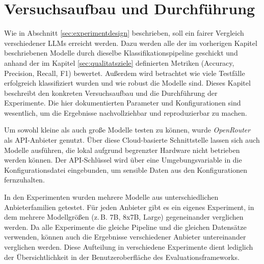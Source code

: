 \chapter{Versuchsaufbau und Durchführung}\label{ch:versuchsaufbau-und-durchfuhrung}

Wie in Abschnitt \ref{sec:experimentdesign} beschrieben, soll ein fairer Vergleich verschiedener \acp{LLM} erreicht werden. Dazu werden alle der im vorherigen Kapitel beschriebenen Modelle durch dieselbe Klassifikationspipeline geschickt und anhand der im Kapitel \ref{sec:qualitatsziele} definierten Metriken (Accuracy, Precision, Recall, F1) bewertet. Außerdem wird betrachtet wie viele Testfälle erfolgreich klassifiziert wurden und wie robust die Modelle sind. Dieses Kapitel beschreibt den konkreten Versuchsaufbau und die Durchführung der Experimente. Die hier dokumentierten Parameter und Konfigurationen sind wesentlich, um die Ergebnisse nachvollziehbar und reproduzierbar zu machen.

Um sowohl kleine als auch große Modelle testen zu können, wurde \emph{OpenRouter} \cite{openrouter} als API-Anbieter genutzt. Über diese Cloud-basierte Schnittstelle lassen sich auch Modelle ausführen, die lokal aufgrund begrenzter Hardware nicht betrieben werden können. Der API-Schlüssel wird über eine Umgebungsvariable in die Konfigurationsdatei eingebunden, um sensible Daten aus den Konfigurationen fernzuhalten.

In den Experimenten wurden mehrere Modelle aus unterschiedlichen Anbieterfamilien getestet. Für jeden Anbieter gibt es ein eigenes Experiment, in dem mehrere Modellgrößen (z.\,B. 7B, 8x7B, Large) gegeneinander verglichen werden. Da alle Experimente die gleiche Pipeline und die gleichen Datensätze verwenden, können auch die Ergebnisse verschiedener Anbieter untereinander verglichen werden. Diese Aufteilung in verschiedene Experimente dient lediglich der Übersichtlichkeit in der Benutzeroberfläche des Evaluationsframeworks.




